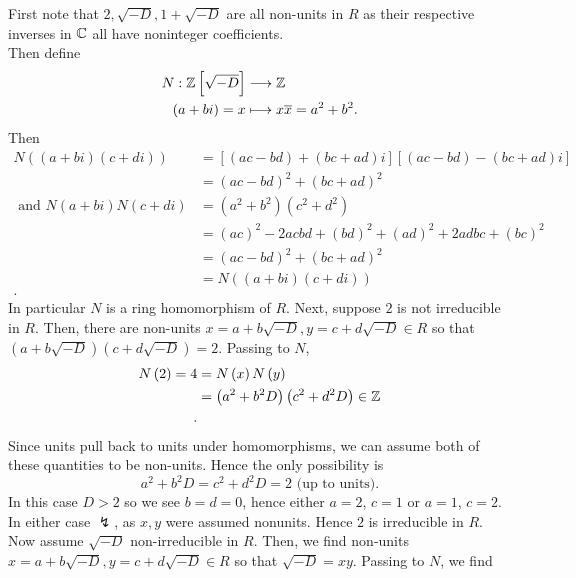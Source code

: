 \documentclass[a4paper]{article}
\begin{document}
\begin{problem}[2]
	\item First note that \(2, \sqrt{-D}, 1 + \sqrt{-D} \) are all non-units in \(R\) as their respective inverses in \(\mathbb{C}\) all have noninteger coefficients.\\
		 Then define \begin{align*}
			N: \mathbb{Z}\left[ \sqrt{-D}  \right]   &\longrightarrow \mathbb{Z} \\
			\left( a+bi \right) = x &\longmapsto  x \overline{x} = a^2 + b^2
		.\end{align*}
	Then
	\begin{align*}
		N\left( \left( a+bi \right) \left( c+di \right)  \right) &= \left[ \left( ac-bd \right) + \left( bc+ad \right) i \right] \left[ \left( ac-bd \right) - \left( bc+ad \right) i \right] \\
&= \left( ac-bd \right) ^2 + \left( bc+ad \right) ^2 \\
\text{ and } N\left( a+bi \right) N\left( c+di \right) &= \left( a^2+b^2 \right) \left( c^2 + d^2  \right)   \\
&= \left( ac \right) ^2 -2ac bd + \left( bd \right) ^2 + \left( ad \right) ^2 + 2ad bc  + \left( bc \right) ^2 \\
&= \left( ac-bd \right) ^2 + \left( bc + ad \right) ^2 \\
&= N\left( \left( a+bi \right) \left( c+di \right)  \right)  \\
	.\end{align*}
	In particular \(N\) is a ring homomorphism of \(R\).
	Next, suppose \(2\) is not irreducible in \(R\). Then, there are non-units \(x = a + b\sqrt{-D}, y=  c + d\sqrt{-D} \in R \) so that \( \left( a+b\sqrt{-D}  \right) \left( c+d\sqrt{-D}  \right) = 2 \). Passing to \(N\),
	\begin{align*}
		N\left( 2 \right) = 4 &=  N\left( x \right)N\left( y \right)   \\
		&= \left( a^2 + b^2 D \right) \left( c ^2 + d^2 D \right) \in \mathbb{Z}  \\
	.\end{align*}
	Since units pull back to units under homomorphisms, we can assume both of these quantities to be non-units. Hence the only possibility is \[
	a^2 + b^2 D = c ^2 + d^2 D = 2 \text{ (up to units)}
	.\]
	In this case \(D > 2\)  so we see \(b = d = 0\), hence either \(a=2\), \(c =1\) or \(a=1\), \(c=2\). In either case \(\lightning\), as \(x, y\) were assumed nonunits. Hence \(2\) is irreducible in \(R\).\\
	Now assume \(\sqrt{-D} \) non-irreducible in \(R\). Then, we find non-units \(x = a + b\sqrt{-D} , y = c + d\sqrt{-D}  \in R\) so that \(\sqrt{-D} = xy\). Passing to \(N\), we find

\end{problem}
\end{document}

